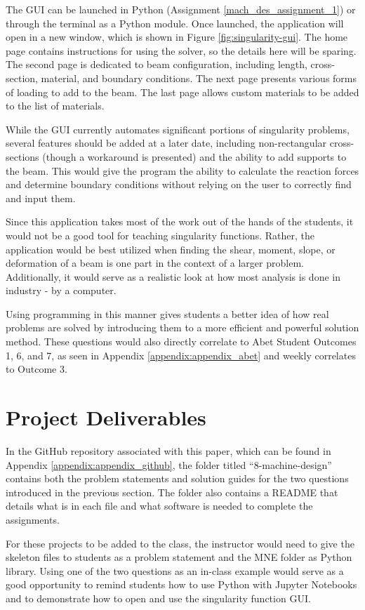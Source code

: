 The GUI can be launched in Python (Assignment \ref{mach_des_assignment_1}) or through
the terminal as a Python module. Once launched, the application will open in a new window, which is shown
in Figure \ref{fig:singularity-gui}. The home page contains instructions for using the solver, so the details 
here will be sparing. The second page is dedicated to beam configuration, including length, cross-section, 
material, and boundary conditions. The next page presents various forms of loading to add
to the beam. The last page allows custom materials to be added to the list of materials.

While the GUI currently automates significant portions of singularity problems, several features should be
added at a later date, including non-rectangular cross-sections (though a workaround is presented) and
the ability to add supports to the beam. This would give the program the ability to calculate the reaction
forces and determine boundary conditions without relying on the user to correctly find and input them.

Since this application takes most of the work out of the hands of the students, it would not be a good tool
for teaching singularity functions. Rather, the application would be best utilized when finding the shear,
moment, slope, or deformation of a beam is one part in the context of a larger problem. Additionally, 
it would serve as a realistic look at how most analysis is done in industry - by a computer.

Using programming in this manner gives students a better idea of how real problems are solved by
introducing them to a more efficient and powerful solution method. These questions would also 
directly correlate to Abet Student Outcomes 1, 6, and 7, as seen in Appendix 
\ref{appendix:appendix_abet} and weekly correlates to Outcome 3.

\section{Project Deliverables}

In the GitHub repository associated with this paper, which can be found in Appendix \ref{appendix:appendix_github},
the folder titled ``8-machine-design'' contains both the problem statements and solution guides for the two questions
introduced in the previous section. The folder also contains a README that details what is in each file and 
what software is needed to complete the assignments. 

For these projects to be added to the class, the instructor would  need to give the skeleton files to 
students as a problem statement and the MNE folder as Python library. Using one of the two questions as an in-class
example would serve as a good opportunity to remind students how to use Python with Jupyter Notebooks and to 
demonstrate how to open and use the singularity function GUI.
